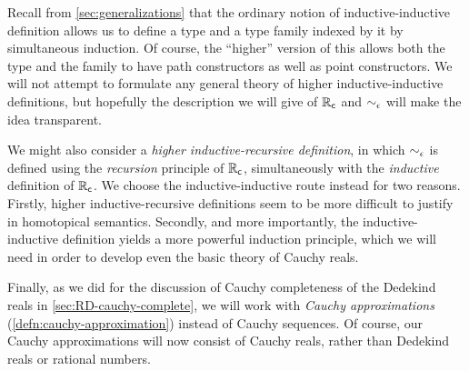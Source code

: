 Recall from \autoref{sec:generalizations} that the ordinary notion of inductive-inductive definition allows us to define a type and a type family indexed by it by simultaneous induction.
Of course, the ``higher'' version of this allows both the type and the family to have path constructors as well as point constructors.
We will not attempt to formulate any general theory of higher inductive-inductive definitions, but hopefully the description we will give of $\mathbb{R}_\mathsf{c}$ and $\sim_{\epsilon}$ will make the idea transparent.

\begin{rmk}
  We might also consider a \emph{higher inductive-recursive definition}, in which $\sim_{\epsilon}$ is defined using the \emph{recursion} principle of $\mathbb{R}_\mathsf{c}$, simultaneously with the \emph{inductive} definition of $\mathbb{R}_\mathsf{c}$.
  We choose the inductive-inductive route instead for two reasons.
  Firstly, higher inductive-re\-cur\-sive definitions seem to be more difficult to justify in homotopical semantics.
  Secondly, and more importantly, the inductive-inductive definition yields a more powerful induction principle, which we will need in order to develop even the basic theory of Cauchy reals.
\end{rmk}

Finally, as we did for the discussion of Cauchy completeness of the Dedekind reals in \autoref{sec:RD-cauchy-complete}, we will work with \emph{Cauchy approximations} (\autoref{defn:cauchy-approximation}) instead of Cauchy sequences.
Of course, our Cauchy approximations will now consist of Cauchy reals, rather than Dedekind reals or rational numbers.

